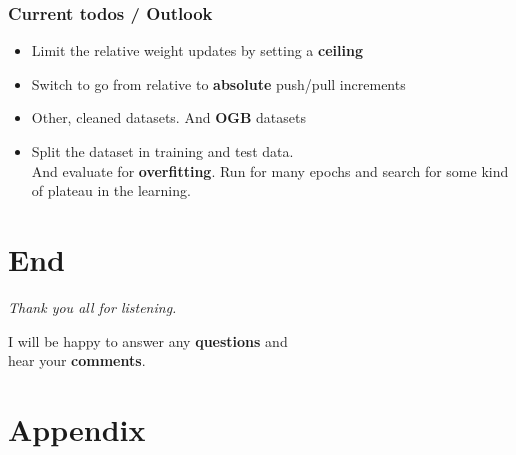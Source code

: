 \begin{frame}
	\frametitle{Current todos / Outlook}
	\begin{itemize}
		\item Limit the relative weight updates by setting a \textbf{ceiling}
		\item Switch to go from relative to \textbf{absolute} push/pull increments
		\item Other, cleaned datasets. And \textbf{OGB} datasets
		\item Split the dataset in training and test data.\\
		And evaluate for \textbf{overfitting}. Run for many epochs and search for some kind of plateau in the learning.
	\end{itemize}
\end{frame}

\section{End}

\begin{frame}[c]
	\centering %
	\begin{huge}
		\emph{Thank you all for listening.}\\
	\end{huge}
	\vspace{2 cm}
	I will be happy to answer any \textbf{questions} and\\
	hear your \textbf{comments}.
\end{frame}

\appendix
\section{Appendix}



